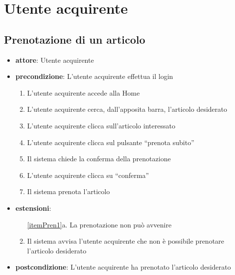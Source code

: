 \chapter{Utente acquirente}


\section{Prenotazione di un articolo}
\begin{itemize}
    \item \textbf{attore}: Utente acquirente
    \item \textbf{precondizione}: L’utente acquirente effettua il login

    \begin{enumerate}
        \item L’utente acquirente accede alla Home
        \item L’utente acquirente cerca, dall’apposita barra, l’articolo desiderato
        \item L’utente acquirente clicca sull’articolo interessato
        \item L’utente acquirente clicca sul pulsante “prenota subito”
        \item Il sistema chiede la conferma della prenotazione
        \label{itemPren1}
        \item L'utente acquirente clicca su “conferma”
        \item Il sistema prenota l’articolo
    \end{enumerate}

    \item \textbf{estensioni}:
    \begin{enumerate}
        \item[\ref{itemPren1}a.] La prenotazione non può avvenire
        \item Il sistema avvisa l’utente acquirente che non è possibile prenotare l’articolo desiderato
    \end{enumerate}

    \item \textbf{postcondizione}: L’utente acquirente ha prenotato l’articolo desiderato
\end{itemize}



